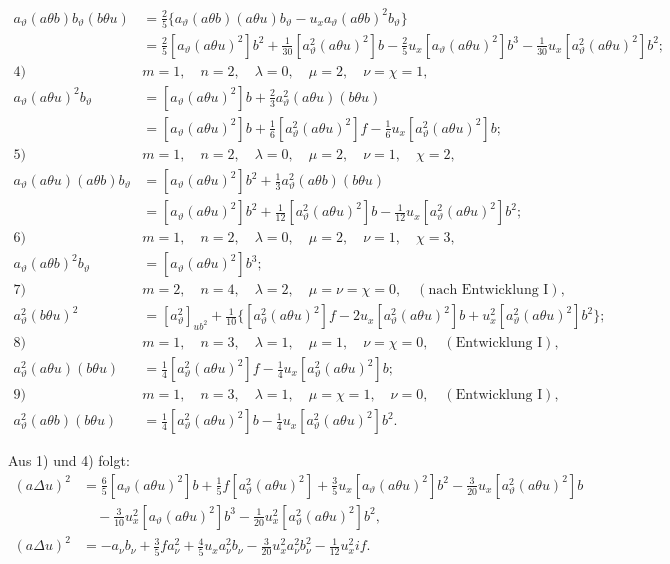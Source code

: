 \documentclass[11pt]{article}
\begin{document}
\begin{align*}
a_\vartheta(a\theta b)b_\vartheta(b\theta u)
&=\frac25\{a_\vartheta(a\theta b)(a\theta u)b_\vartheta-u_xa_\vartheta(a\theta b)^2b_\vartheta\}\\
&=\frac25[a_\vartheta(a\theta u)^2]b^2+\frac1{30}[a_\vartheta^2(a\theta u)^2]b-\frac25u_x[a_\vartheta(a\theta u)^2]b^3-\frac1{30}u_x[a_\vartheta^2(a\theta u)^2]b^2;\\[.6em]
\text{4)}\quad&m=1,\quad n=2,\quad \lambda=0,\quad \mu=2,\quad \nu=\chi=1,\\
a_\vartheta(a\theta u)^2b_\vartheta
&=[a_\vartheta(a\theta u)^2]b+\frac23a_\vartheta^2(a\theta u)(b\theta u)\\
&=[a_\vartheta(a\theta u)^2]b+\frac16[a_\vartheta^2(a\theta u)^2]f-\frac16u_x[a_\vartheta^2(a\theta u)^2]b;\\[.6em]
\text{5)}\quad&m=1,\quad n=2,\quad \lambda=0,\quad \mu=2,\quad \nu=1,\quad \chi=2,\\
a_\vartheta(a\theta u)(a\theta b)b_\vartheta
&=[a_\vartheta(a\theta u)^2]b^2+\frac13a_\vartheta^2(a\theta b)(b\theta u)\\
&=[a_\vartheta(a\theta u)^2]b^2+\frac1{12}[a_\vartheta^2(a\theta u)^2]b-\frac1{12}u_x[a_\vartheta^2(a\theta u)^2]b^2;\\[.6em]
\text{6)}\quad&m=1,\quad n=2,\quad \lambda=0,\quad \mu=2,\quad \nu=1,\quad \chi=3,\\
a_\vartheta(a\theta b)^2b_\vartheta&=[a_\vartheta(a\theta u)^2]b^3;\\[.6em]
\text{7)}\quad&m=2,\quad n=4,\quad \lambda=2,\quad \mu=\nu=\chi=0,\quad (\text{nach Entwicklung I}),\\
a_\vartheta^2(b\theta u)^2&=[a_\vartheta^2]_{ub^2}+\frac1{10}\{[a_\vartheta^2(a\theta u)^2]f-2u_x[a_\vartheta^2(a\theta u)^2]b+u_x^2[a_\vartheta^2(a\theta u)^2]b^2\};\\[.6em]
\text{8)}\quad&m=1,\quad n=3,\quad \lambda=1,\quad \mu=1,\quad \nu=\chi=0,\quad (\text{Entwicklung I}),\\
a_\vartheta^2(a\theta u)(b\theta u)&=\frac14[a_\vartheta^2(a\theta u)^2]f-\frac14u_x[a_\vartheta^2(a\theta u)^2]b;\\[.6em]
\text{9)}\quad&m=1,\quad n=3,\quad \lambda=1,\quad \mu=\chi=1,\quad \nu=0,\quad (\text{Entwicklung I}),\\
a_\vartheta^2(a\theta b)(b\theta u)&=\frac14[a_\vartheta^2(a\theta u)^2]b-\frac14u_x[a_\vartheta^2(a\theta u)^2]b^2.
\end{align*}

Aus 1) und 4) folgt:
\[
\begin{aligned}
(a\Delta u)^2
&=\frac65[a_\vartheta(a\theta u)^2]b+\frac15f[a_\vartheta^2(a\theta u)^2]+\frac35u_x[a_\vartheta(a\theta u)^2]b^2-\frac3{20}u_x[a_\vartheta^2(a\theta u)^2]b\\
&\quad-\frac3{10}u_x^2[a_\vartheta(a\theta u)^2]b^3-\frac1{20}u_x^2[a_\vartheta^2(a\theta u)^2]b^2,\\
(a\Delta u)^2
&=-a_\nu b_\nu+\frac35fa_\nu^2+\frac45u_xa_\nu^2b_\nu-\frac3{20}u_x^2a_\nu^2b_\nu^2-\frac1{12}u_x^2if.
\end{aligned}
\]
\end{document}
